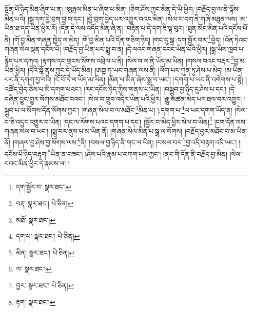 སྔོན་པོ་ཉིད་མིན་ཞིག་པ་ན། །ཨུཏྤལ་མིན་པ་ཞིག་པ་མིན། །ཅིག་ཤོས་ཀྱང་མིན་དེ་ཡི་ཕྱིར། །བརྗོད་བྱ་ལ་ནི་ལྟོས་མིན་པའི། །སྒྲ་དག་བྱེ་བྲག་བྱ་བ་དང་། །བྱེ་བྲག་བྱེད་པར་འགྱུར་བའང་མིན། །སེལ་བ་དག་ནི་གཞི་མཐུན་ལས། །མ་ཡིན་ཐ་དད་ཡིན་ཕྱིར་རོ། །དོན་དེ་ལས་འདོད་མིན་ཞེ་ན། །བརྟེན་པ་དེ་དག་ཇི་ལྟ་བུར། །ཐུན་མོང་མིན་པའི་དངོས་པོ་ནི། །གོ་བྱ་མིན་གཞན་ཁྱེད་ལ་མེད། །གོ་བྱ་མིན་པའི་དོན་གཅིག་ཉིད། །གང་དུ་སྒྲ་:དག་སྦྱོར་བར་\footnote{དག་སྦྱོར་བ་  སྣར་ཐང་། }བྱེད། །འོན་ཏེའང་གཞན་སེལ་ལྡན་དངོས་པོ། །བརྗོད་བྱ་ཡིན་པར་སྨྲ་བ་ན། །དེ་ལའང་གཞན་དབང་ཡིན་པའི་ཕྱིར། །སྒྲ་ཡིས་ཁྱབ་པ་རྙེད་པར་དཀའ། །རྟགས་དང་གྲངས་སོགས་འབྲེལ་པ་ནི། །སེལ་བ་ལ་ནི་ཡོད་མ་ཡིན། །གསལ་བའང་བརྡར་\footnote{བརྡ་  སྣར་ཐང་།  པེ་ཅིན། }བྱ་མ་ཡིན་ཕྱིར། །དེའི་སྒོ་ནས་ཀྱང་དེ་ཡོད་མིན། །ཨཀྵ་ཏ་ཡང་གཞན་ལས་ནི། །ལོག་པར་ཀུན་ཏུ་ཤེས་པ་མེད། །མ་ཡིན་པར་ནི་དགག་བྱ་བའི། །ངོ་བོ་དེ་ལ་ཡོད་མ་ཡིན། །མིན་པ་མིན་ཞེས་སྨྲ་བ་ཡང་། །དགག་པ་ཡང་ནི་འགེགས་པ་སྟེ། །འཚོད་བྱེད་ཅེས་པ་མི་དགག་པའང་། །རང་དངོས་ཉིད་ཀྱིས་གནས་པ་ཡིན། །བསྒྲུབ་བྱ་ཉིད་དུ་ཤེས་པ་དང་། །དེ་བཞིན་བྱུང་གྱུར་སོགས་མཐོང་བའང་། །སེལ་བ་གྲུབ་འདིར་ཡིན་པའི་ཕྱིར། །རྒྱུ་མཚན་མེད་པར་ཐལ་བར་འགྱུར། །སྒྲུབ་པ་ལ་སོགས་དོན་སོགས་ཀྱང་། །གཞན་སེལ་བ་ལ་མཐོང་\footnote{མཐོ་  སྣར་ཐང་། }མིན་པ། །:དགག་པ་\footnote{དག་པ་  སྣར་ཐང་།  པེ་ཅིན། }ལ་ཡང་དགག་ཡོད་ན། །སེལ་བ་ཅི་འདྲར་འགྱུར་བ་ཡིན། །དང་ལ་སོགས་པའང་དགག་པ་དང་། །སྦྱོར་བ་མེད་ཕྱིར་སེལ་བ་ཡིན།\footnote{མིན།  སྣར་ཐང་།  པེ་ཅིན། } །ངག་དོན་ལས་གཞན་སེལ་བ་ཡང་། །སྨྲ་བར་ནུས་པ་མ་ཡིན་ནོ། །གཞན་སེལ་མིན་པ་སྒྲ་ལ་སོགས། །བརྗོད་བྱར་མཐོང་བ་མ་ཡིན་ནོ། །གཞལ་བྱ་ཤེས་བྱ་སོགས་ལས་\footnote{ལ་  སྣར་ཐང་། }ནི། །བསལ་བྱ་ཉིད་ནི་གང་ལ་ཡིན། །བསལ་བར་\footnote{བྱར་  སྣར་ཐང་།  པེ་ཅིན། }བྱ་འདི་བརྟག་འདི་ཡང་། །དངོས་པོ་ཉིད་བརྟག་\footnote{རྟག་  སྣར་ཐང་། }ཡིན་ན་བཟང་། །ཤེས་པའི་རྣམ་པ་བཀག་པས་ཀྱང་། །ནང་གི་དོན་ནི་བརྗོད་བྱ་མིན། །སེལ་བའང་མིན་ཕྱིར་དེ་རྣམས་ལ། །
